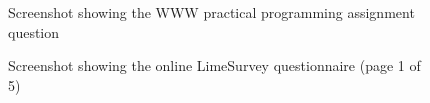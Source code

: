\begin{figure}
 \centering
 \caption[Screenshot showing the practical assignment question]{Screenshot showing the WWW practical programming assignment question}
 \label{appendix:appendicies:developer-survey:developer-survey-questionnaire1}
\end{figure}


% 

\begin{figure}
 \centering
 \caption[Screenshot showing the online questionnaire (page 1 of 5)]{Screenshot showing the online LimeSurvey questionnaire (page 1 of 5)}
 \label{appendix:appendicies:developer-suvery-one-page-001}
\end{figure}

